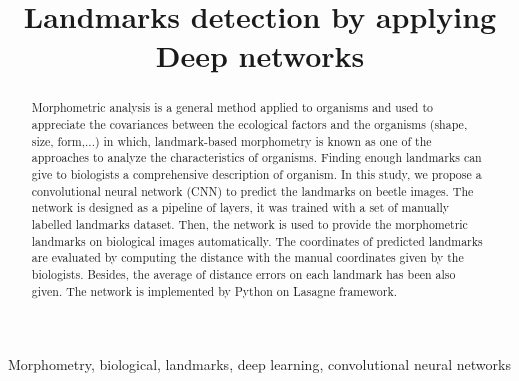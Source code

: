 \documentclass[conference]{IEEEtran}
\begin{document}
\title{Landmarks detection by applying Deep networks}

\author{
\and
{}
\and
{}
\and
{}
}

\maketitle

\begin{abstract}
Morphometric analysis is a general method applied to organisms and used to appreciate the covariances between the ecological factors and the organisms (shape, size, form,...) in which, landmark-based morphometry is known as one of the approaches to analyze the characteristics of organisms. Finding enough landmarks can give to biologists a comprehensive description of organism. In this study, we propose a convolutional neural network (CNN) to predict the landmarks on beetle images. The network is designed as a pipeline of layers, it was trained with a set of manually labelled landmarks dataset. Then, the network is used to provide the morphometric landmarks on biological images automatically. The coordinates of predicted landmarks are evaluated by computing the distance with the manual coordinates given by the biologists. Besides, the average of distance errors on each
landmark has been also given. The network is implemented by Python on Lasagne framework.
\end{abstract}

\begin{IEEEkeywords}
Morphometry, biological, landmarks, deep learning, convolutional neural networks
\end{IEEEkeywords}
\end{document}
